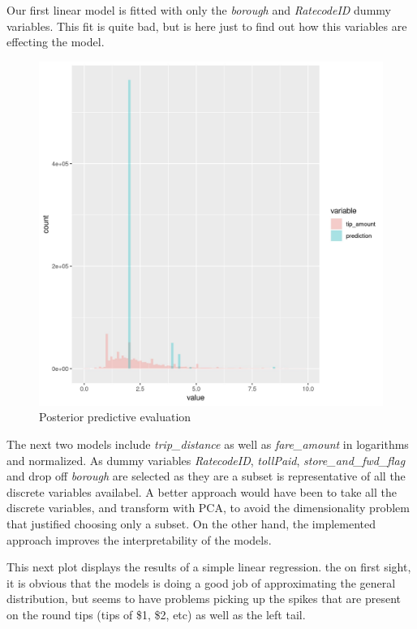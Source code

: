 \documentclass[11pt]{article}
\begin{document}
Our first linear model is fitted with only the \emph{borough} and \emph{RatecodeID}
dummy variables. This fit is quite bad, but is here just to find out how
this variables are effecting the model.

\begin{figure}[htbp]
\centering
\includegraphics[width=.9\linewidth]{./plots/evaluation0PosteriorPredictive.jpg}
\caption{\label{fig:org0bfb122}
Posterior predictive evaluation}
\end{figure}

The next two models include \emph{trip\_distance} as well as \emph{fare\_amount} in
logarithms and normalized. As dummy variables \emph{RatecodeID}, \emph{tollPaid},
\emph{store\_and\_fwd\_flag} and drop off \emph{borough} are selected as they are a
subset is representative of all the discrete variables availabel. A better
approach would have been to take all the discrete variables, and transform
with PCA, to avoid the dimensionality problem that justified choosing only
a subset. On the other hand, the implemented approach improves the
interpretability of the models.

This next plot displays the results of a simple linear regression.
the on first sight, it is obvious that the models is doing a good job
of approximating the general distribution, but seems to have problems
picking up the spikes that are present on the round tips (tips of \$1, \$2, etc)
as well as the left tail.
\end{document}

